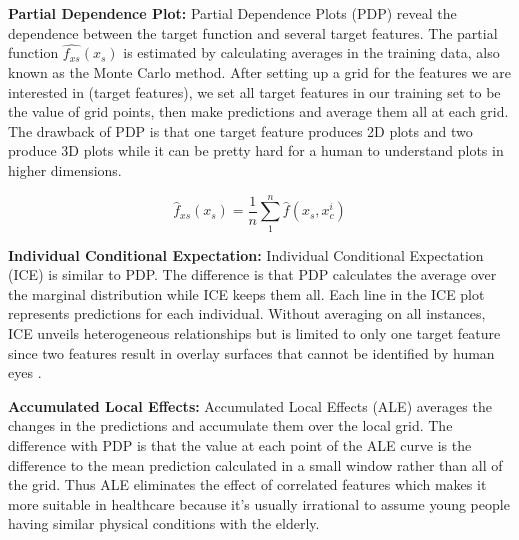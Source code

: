 
\textbf{Partial Dependence Plot: } Partial Dependence Plots (PDP) reveal the dependence between the target function and several target features. The partial function $ \hat{f_{xs}}(x_s) $ is estimated by calculating averages in the training data, also known as the Monte Carlo method. After setting up a grid for the features we are interested in (target features), we set all target features in our training set to be the value of grid points, then make predictions and average them all at each grid. The drawback of PDP is that one target feature produces 2D plots and two produce 3D plots while it can be pretty hard for a human to understand plots in higher dimensions.

\begin{equation}
    \label{eq:1}
    \hat{f}_{xs}(x_s) = \frac{1}{n}\sum_{1}^{n}\hat{f}(x_s, x_c^{i})
\end{equation}

\textbf{Individual Conditional Expectation: } Individual Conditional Expectation (ICE) is similar to PDP. The difference is that PDP calculates the average over the marginal distribution while ICE keeps them all. Each line in the ICE plot represents predictions for each individual. Without averaging on all instances, ICE unveils heterogeneous relationships but is limited to only one target feature since two features result in overlay surfaces that cannot be identified by human eyes \citep{molnar2019}.

\textbf{Accumulated Local Effects: } Accumulated Local Effects (ALE) averages the changes in the predictions and accumulate them over the local grid. The difference with PDP is that the value at each point of the ALE curve is the difference to the mean prediction calculated in a small window rather than all of the grid. Thus ALE eliminates the effect of correlated features \citep{molnar2019} which makes it more suitable in healthcare because it's usually irrational to assume young people having similar physical conditions with the elderly.

